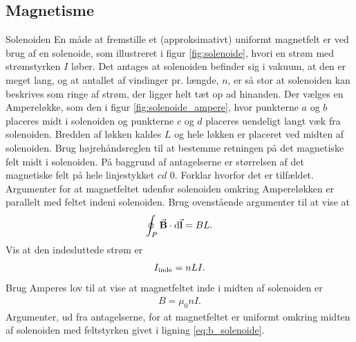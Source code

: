\documentclass[crop=false, class=memoir]{standalone}
\begin{document}
\subsection*{Magnetisme}
\begin{opgave}[3]{Solenoiden}
    En måde at fremstille et (approksimativt) uniformt magnetfelt er ved brug af en solenoide, som illustreret i figur \ref{fig:solenoide}, hvori en strøm med strømstyrken $I$ løber. Det antages at solenoiden befinder sig i vakuum, at den er meget lang, og at antallet af  vindinger pr. længde, $n$, er så stor at solenoiden kan beskrives som ringe af strøm, der ligger helt tæt op ad hinanden. Der vælges en Ampereløkke, som den i figur \ref{fig:solenoide_ampere}, hvor punkterne $a$ og $b$ placeres midt i solenoiden og punkterne $c$ og $d$ placeres uendeligt langt væk fra solenoiden. Bredden af løkken kaldes $L$ og hele løkken er placeret ved midten af solenoiden.
    \opg Brug højrehåndsreglen til at bestemme retningen på det magnetiske felt midt i solenoiden.
    \opg På baggrund af antagelserne er størrelsen af det magnetiske felt på hele linjestykket $cd$ 0. Forklar hvorfor det er tilfældet.
    \opg Argumenter for at magnetfeltet udenfor solenoiden omkring Ampereløkken er parallelt med feltet indeni solenoiden.
    \opg Brug ovenstående argumenter til at vise at
    \begin{align*}
        \oint_P \va B \cdot \dd{\va l} = BL.
    \end{align*}
    \opg Vis at den indesluttede strøm er
    \begin{align*}
        I_\textup{inde} = nLI.
    \end{align*}
    \opg Brug Amperes lov til at vise at magnetfeltet inde i midten af solenoiden er
    \begin{align} \label{eq:b_solenoide}
        B = \mu_0nI.
    \end{align}
    \opg Argumenter, ud fra antagelserne, for at magnetfeltet er uniformt omkring midten af solenoiden med feltstyrken givet i ligning \ref{eq:b_solenoide}.


\end{opgave}
\end{document}
